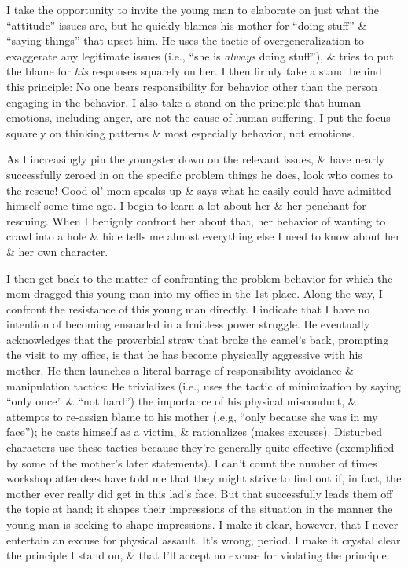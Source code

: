 \documentclass{article}
\numberwithin{equation}{section}
\begin{document}
I take the opportunity to invite the young man to elaborate on just what the ``attitude'' issues are, but he quickly blames his mother for ``doing stuff'' \& ``saying things'' that upset him. He uses the tactic of overgeneralization to exaggerate any legitimate issues (i.e., ``she is \textit{always} doing stuff''), \& tries to put the blame for \textit{his} responses squarely on her. I then firmly take a stand behind this principle: No one bears responsibility for behavior other than the person engaging in the behavior. I also take a stand on the principle that human emotions, including anger, are not the cause of human suffering. I put the focus squarely on thinking patterns \& most especially behavior, not emotions.

As I increasingly pin the youngster down on the relevant issues, \& have nearly successfully zeroed in on the specific problem things he does, look who comes to the rescue! Good ol' mom speaks up \& says what he easily could have admitted himself some time ago. I begin to learn a lot about her \& her penchant for rescuing. When I benignly confront her about that, her behavior of wanting to crawl into a hole \& hide tells me almost everything else I need to know about her \& her own character.

I then get back to the matter of confronting the problem behavior for which the mom dragged this young man into my office in the 1st place. Along the way, I confront the resistance of this young man directly. I indicate that I have no intention of becoming ensnarled in a fruitless power struggle. He eventually acknowledges that the proverbial straw that broke the camel's back, prompting the visit to my office, is that he has become physically aggressive with his mother. He then launches a literal barrage of responsibility-avoidance \& manipulation tactics: He trivializes (i.e., uses the tactic of minimization by saying ``only once'' \& ``not hard'') the importance of his physical misconduct, \& attempts to re-assign blame to his mother (.e.g, ``only because she was in my face''); he casts himself as a victim, \& rationalizes (makes excuses). Disturbed characters use these tactics because they're generally quite effective (exemplified by some of the mother's later statements). I can't count the number of times workshop attendees have told me that they might strive to find out if, in fact, the mother ever really did get in this lad's face. But that successfully leads them off the topic at hand; it shapes their impressions of the situation in the manner the young man is seeking to shape impressions. I make it clear, however, that I never entertain an excuse for physical assault. It's wrong, period. I make it crystal clear the principle I stand on, \& that I'll accept no excuse for violating the principle.
\end{document}

